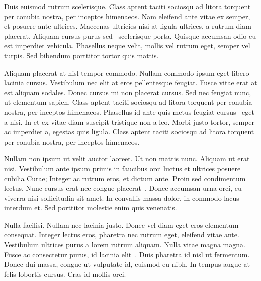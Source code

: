 Duis euismod rutrum scelerisque. Class aptent taciti sociosqu ad litora torquent per conubia nostra, per inceptos himenaeos. Nam eleifend ante vitae ex semper, et posuere ante ultrices. Maecenas ultricies nisi at ligula ultrices, a rutrum diam placerat. Aliquam cursus purus sed~\cite{book} scelerisque porta. Quisque accumsan odio eu est imperdiet vehicula. Phasellus neque velit, mollis vel rutrum eget, semper vel turpis. Sed bibendum porttitor tortor quis mattis.

Aliquam placerat at nisl tempor commodo. Nullam commodo ipsum eget libero lacinia cursus. Vestibulum nec elit at eros pellentesque feugiat. Fusce vitae erat at est aliquam sodales. Donec cursus mi non placerat cursus. Sed nec feugiat nunc, ut elementum sapien. Class aptent taciti sociosqu ad litora torquent per conubia nostra, per inceptos himenaeos. Phasellus id ante quis metus feugiat cursus~\cite{booklet} eget a nisi. In et ex vitae diam suscipit tristique non a leo. Morbi justo tortor, semper ac imperdiet a, egestas quis ligula. Class aptent taciti sociosqu ad litora torquent per conubia nostra, per inceptos himenaeos.

Nullam non ipsum ut velit auctor laoreet. Ut non mattis nunc. Aliquam ut erat nisi. Vestibulum ante ipsum primis in faucibus orci luctus et ultrices posuere cubilia Curae; Integer ac rutrum eros, et dictum ante. Proin sed condimentum lectus. Nunc cursus erat nec congue placerat~\cite{conference}. Donec accumsan urna orci, eu viverra nisi sollicitudin sit amet. In convallis massa dolor, in commodo lacus interdum et. Sed porttitor molestie enim quis venenatis.

Nulla facilisi. Nullam nec lacinia justo. Donec vel diam eget eros elementum consequat. Integer lectus eros, pharetra nec rutrum eget, eleifend vitae ante. Vestibulum ultrices purus a lorem rutrum aliquam. Nulla vitae magna magna. Fusce ac consectetur purus, id lacinia elit~\cite{proceedings}. Duis pharetra id nisl ut fermentum. Donec dui massa, congue ut vulputate id, euismod eu nibh. In tempus augue at felis lobortis cursus. Cras id mollis orci.
